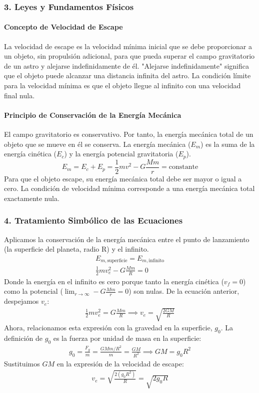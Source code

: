 \subsubsection*{3. Leyes y Fundamentos Físicos}
\paragraph*{Concepto de Velocidad de Escape}
La velocidad de escape es la velocidad mínima inicial que se debe proporcionar a un objeto, sin propulsión adicional, para que pueda superar el campo gravitatorio de un astro y alejarse indefinidamente de él. "Alejarse indefinidamente" significa que el objeto puede alcanzar una distancia infinita del astro. La condición límite para la velocidad mínima es que el objeto llegue al infinito con una velocidad final nula.

\paragraph*{Principio de Conservación de la Energía Mecánica}
El campo gravitatorio es conservativo. Por tanto, la energía mecánica total de un objeto que se mueve en él se conserva. La energía mecánica ($E_m$) es la suma de la energía cinética ($E_c$) y la energía potencial gravitatoria ($E_p$).
$$ E_m = E_c + E_p = \frac{1}{2}mv^2 - G\frac{Mm}{r} = \text{constante} $$
Para que el objeto escape, su energía mecánica total debe ser mayor o igual a cero. La condición de velocidad mínima corresponde a una energía mecánica total exactamente nula.

\subsubsection*{4. Tratamiento Simbólico de las Ecuaciones}
Aplicamos la conservación de la energía mecánica entre el punto de lanzamiento (la superficie del planeta, radio R) y el infinito.
\begin{gather}
    E_{m, \text{superficie}} = E_{m, \text{infinito}} \nonumber \\
    \frac{1}{2}mv_e^2 - G\frac{Mm}{R} = 0
\end{gather}
Donde la energía en el infinito es cero porque tanto la energía cinética ($v_f=0$) como la potencial ($\lim_{r \to \infty} -G\frac{Mm}{r} = 0$) son nulas.
De la ecuación anterior, despejamos $v_e$:
\begin{gather}
    \frac{1}{2}mv_e^2 = G\frac{Mm}{R} \implies v_e = \sqrt{\frac{2GM}{R}}
\end{gather}
Ahora, relacionamos esta expresión con la gravedad en la superficie, $g_0$. La definición de $g_0$ es la fuerza por unidad de masa en la superficie:
\begin{gather}
    g_0 = \frac{F_g}{m} = \frac{G M m/R^2}{m} = \frac{GM}{R^2} \implies GM = g_0 R^2
\end{gather}
Sustituimos $GM$ en la expresión de la velocidad de escape:
\begin{gather}
    v_e = \sqrt{\frac{2(g_0 R^2)}{R}} = \sqrt{2g_0 R}
\end{gather}


